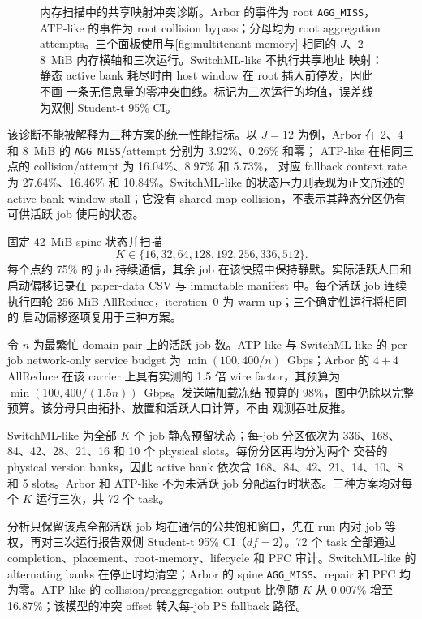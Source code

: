 \begin{figure}[t]
\centering

\caption{内存扫描中的共享映射冲突诊断。Arbor 的事件为 root
\texttt{AGG\_MISS}，ATP-like 的事件为 root collision bypass；分母均为
root aggregation attempts。三个面板使用与\cref{fig:multitenant-memory}
相同的 $J$、2--8~MiB 内存横轴和三次运行。SwitchML-like 不执行共享地址
映射：静态 active bank 耗尽时由 host window 在 root 插入前停发，因此不画
一条无信息量的零冲突曲线。标记为三次运行的均值，误差线为双侧 Student-t
95\% CI。}
\label{fig:multitenant-pressure}
\end{figure}

该诊断不能被解释为三种方案的统一性能指标。以 $J=12$ 为例，Arbor 在
2、4 和 8~MiB 的 \texttt{AGG\_MISS}/attempt 分别为 3.92\%、0.26\% 和零；
ATP-like 在相同三点的 collision/attempt 为 16.04\%、8.97\% 和 5.73\%，
对应 fallback context rate 为 27.64\%、16.46\% 和 10.84\%。SwitchML-like
的状态压力则表现为正文所述的 active-bank window stall；它没有 shared-map
collision，不表示其静态分区仍有可供活跃 job 使用的状态。

 固定 42~MiB spine 状态并扫描
\[
K\in\{16,32,64,128,192,256,336,512\}.
\]
每个点约 75\% 的 job 持续通信，其余 job 在该快照中保持静默。实际活跃人口和
启动偏移记录在 paper-data CSV 与 immutable manifest 中。每个活跃 job 连续
执行四轮 256-MiB AllReduce，iteration~0 为 warm-up；三个确定性运行将相同的
启动偏移逐项复用于三种方案。

令 $n$ 为最繁忙 domain pair 上的活跃 job 数。ATP-like 与 SwitchML-like 的
per-job network-only service budget 为
$\min(100,400/n)$~Gbps；Arbor 的 $4+4$ AllReduce 在该 carrier 上具有实测的
1.5 倍 wire factor，其预算为 $\min(100,400/(1.5n))$~Gbps。发送端加载冻结
预算的 98\%，图中仍除以完整预算。该分母只由拓扑、放置和活跃人口计算，不由
观测吞吐反推。

SwitchML-like 为全部 $K$ 个 job 静态预留状态；每-job 分区依次为
336、168、84、42、28、21、16 和 10 个 physical slots。每份分区再均分为两个
交替的 physical version banks，因此 active bank 依次含
168、84、42、21、14、10、8 和 5 slots。Arbor 和 ATP-like 不为未活跃 job
分配运行时状态。三种方案均对每个 $K$ 运行三次，共 72 个 task。

分析只保留该点全部活跃 job 均在通信的公共饱和窗口，先在 run 内对 job
等权，再对三次运行报告双侧 Student-t 95\% CI（$df=2$）。72 个 task
全部通过 completion、placement、root-memory、lifecycle 和 PFC 审计。SwitchML-like
的 alternating banks 在停止时均清空；Arbor 的 spine \texttt{AGG\_MISS}、repair
和 PFC 均为零。ATP-like 的 collision/preaggregation-output 比例随 $K$ 从
0.007\% 增至 16.87\%；该模型的冲突 offset 转入每-job PS fallback 路径。

